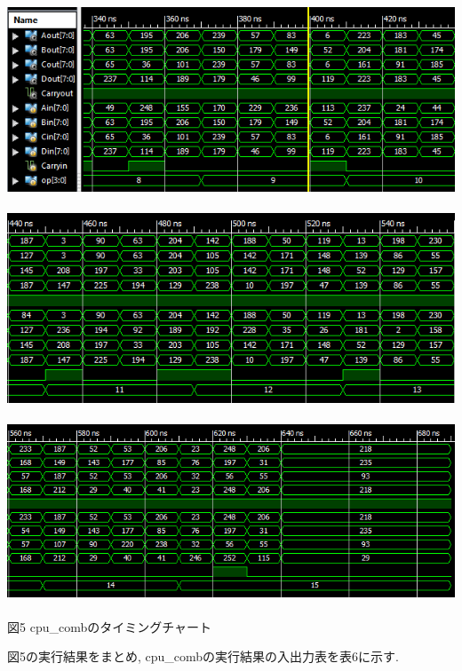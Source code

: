 \documentclass[12pt]{jreport}
\begin{document}
\begin{center}
            \includegraphics[width=18cm]{apu_comb_2_1.png} \\　\\
            \includegraphics[width=18cm]{apu_comb_2_2.png} \\　\\ \newpage
            \includegraphics[width=18cm]{apu_comb_2_3.png} \\　\\
                図5 cpu\_combのタイミングチャート
        \end{center}

        図5の実行結果をまとめ, cpu\_combの実行結果の入出力表を表6に示す. 
\end{document}
